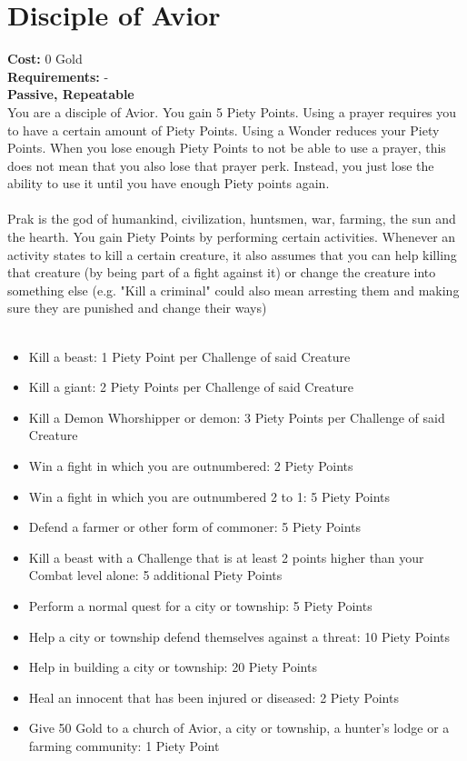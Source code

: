\section*{Disciple of Avior}
\textbf{Cost:} 0 Gold\\
\textbf{Requirements:} - \\
\textbf{Passive, Repeatable}\\
You are a disciple of Avior. You gain 5 Piety Points. Using a prayer requires you to have a certain amount of Piety Points. Using a Wonder reduces your Piety Points. When you lose enough Piety Points to not be able to use a prayer, this does not mean that you also lose that prayer perk. Instead, you just lose the ability to use it until you have enough Piety points again.\\
\\
Prak is the god of humankind, civilization, huntsmen, war, farming, the sun and the hearth. You gain Piety Points by performing certain activities. Whenever an activity states to kill a certain creature, it also assumes that you can help killing that creature (by being part of a fight against it) or change the creature into something else (e.g. "Kill a criminal" could also mean arresting them and making sure they are punished and change their ways)\\
\\
\begin{itemize}
	\item Kill a beast: 1 Piety Point per Challenge of said Creature
	\item Kill a giant: 2 Piety Points per Challenge of said Creature
	\item Kill a Demon Whorshipper or demon: 3 Piety Points per Challenge of said Creature
	\item Win a fight in which you are outnumbered: 2 Piety Points
	\item Win a fight in which you are outnumbered 2 to 1: 5 Piety Points
	\item Defend a farmer or other form of commoner: 5 Piety Points
	\item Kill a beast with a Challenge that is at least 2 points higher than your Combat level alone: 5 additional Piety Points
	\item Perform a normal quest for a city or township: 5 Piety Points
	\item Help a city or township defend themselves against a threat: 10 Piety Points
	\item Help in building a city or township: 20 Piety Points
	\item Heal an innocent that has been injured or diseased: 2 Piety Points
	\item Give 50 Gold to a church of Avior, a city or township, a hunter's lodge or a farming community: 1 Piety Point
\end{itemize}

